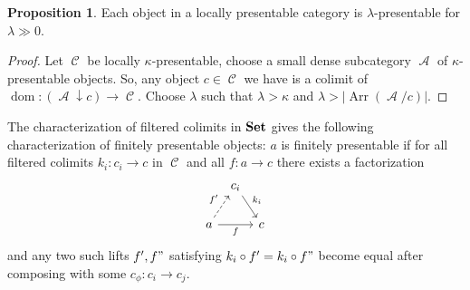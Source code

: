 \documentclass[a4paper,11pt,oneside,openany]{scrbook}
\newcommand{\catname}[1]{{\normalfont\textbf{#1}}}
\DeclareMathOperator{\Arr}{Arr}
\newcommand{\Set}{\catname{Set}}
\newcommand{\from}{\colon}
\newcommand{\card}[1]{\left\lvert #1 \right\rvert}
\DeclareMathOperator{\A}{\mathcal{A}}
\DeclareMathOperator{\C}{\mathcal{C}}
\DeclareMathOperator{\dom}{dom}
\theoremstyle{definition}
\theoremstyle{definition}
\newtheorem{prop}[thm]{Proposition}
\begin{document}
\begin{prop}
   Each object in a locally presentable category is $ \lambda $-presentable
   for $ \lambda \gg 0 $.
\end{prop}
\begin{proof}
    Let $ \C $ be locally $\kappa $-presentable, choose a small dense subcategory $\A $ of $ \kappa $-presentable objects.
    So, any object $ c \in \C $ we have is a colimit of $\dom\colon (\A\downarrow c)\rightarrow\C$.
    Choose $ \lambda $ such that $ \lambda > \kappa $ and $ \lambda > \card{\Arr(\A/c)} $.
\end{proof}
The characterization of filtered colimits in $ \Set $ gives the following characterization of finitely presentable objects:
$ a $ is finitely presentable if for all filtered colimits $ k_i \from c_i \to c $ in $ \C $ and all $ f\from a \to c $ there exists a factorization
\begin{displaymath}
    \begin{tikzcd}[column sep=tiny]
	& c_i \arrow[dr, "k_i"]&\\
	a \arrow[ur, dashed, "f'"]\arrow[rr, "f"']&& c
    \end{tikzcd}
\end{displaymath}
and any two such lifts $ f', f"  $ satisfying $ k_i \circ f' = k_i \circ f" $ become equal after composing with some $ c_\phi \from c_i \to c_j $.
\end{document}
